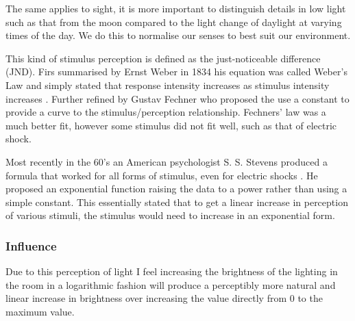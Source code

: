 The same applies to sight, it is more important to distinguish details
in low light such as that from the moon compared to the light change of
daylight at varying times of the day. We do this to normalise our senses
to best suit our environment.

This kind of stimulus perception is defined as the just-noticeable
difference (JND). Firs summarised by Ernst Weber in 1834 his equation
was called Weber's Law and simply stated that response intensity
increases as stimulus intensity increases
\parencite[p. 1613-1615]{salkind2010encyclopedia}. Further refined by
Gustav Fechner who proposed the use a constant to provide a curve to the
stimulus/perception relationship. Fechners' law was a much better fit,
however some stimulus did not fit well, such as that of electric shock.

Most recently in the 60's an American psychologist S. S. Stevens
produced a formula that worked for all forms of stimulus, even for
electric shocks \parencite{stevens1957psychophysical}. He proposed an
exponential function raising the data to a power rather than using a
simple constant. This essentially stated that to get a linear increase
in perception of various stimuli, the stimulus would need to increase in
an exponential form.

\subsubsection{Influence}\label{influence-2}

Due to this perception of light I feel increasing the brightness of the
lighting in the room in a logarithmic fashion will produce a perceptibly
more natural and linear increase in brightness over increasing the value
directly from 0 to the maximum value.
